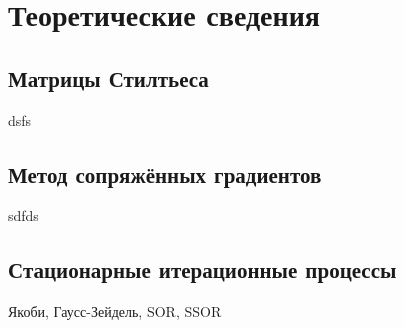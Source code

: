 \section{Теоретические сведения}

\subsection{Матрицы Стилтьеса}
dsfs
\subsection{Метод сопряжённых градиентов}
sdfds
\subsection{Стационарные итерационные процессы}
Якоби, Гаусс-Зейдель, SOR, SSOR